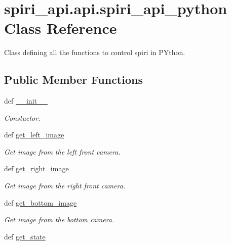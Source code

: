 \hypertarget{classspiri__api_1_1api_1_1spiri__api__python}{\section{spiri\-\_\-api.\-api.\-spiri\-\_\-api\-\_\-python \-Class \-Reference}
\label{classspiri__api_1_1api_1_1spiri__api__python}
}


\-Class defining all the functions to control spiri in \-P\-Ython.  


\subsection*{\-Public \-Member \-Functions}
\begin{DoxyCompactItemize}
\item 
\hypertarget{classspiri__api_1_1api_1_1spiri__api__python_ab9c7abbaa45f26d99e3252b381b24d3b}{def \hyperlink{classspiri__api_1_1api_1_1spiri__api__python_ab9c7abbaa45f26d99e3252b381b24d3b}{\-\_\-\-\_\-init\-\_\-\-\_\-}}\label{classspiri__api_1_1api_1_1spiri__api__python_ab9c7abbaa45f26d99e3252b381b24d3b}

\begin{DoxyCompactList}\small\item\em \-Constuctor. \end{DoxyCompactList}\item 
def \hyperlink{classspiri__api_1_1api_1_1spiri__api__python_a7eb16bb2af3be782182c6c5d29c66d5c}{get\-\_\-left\-\_\-image}
\begin{DoxyCompactList}\small\item\em \-Get image from the left front camera. \end{DoxyCompactList}\item 
def \hyperlink{classspiri__api_1_1api_1_1spiri__api__python_a6718cca393fdcf3973433a9caff9692d}{get\-\_\-right\-\_\-image}
\begin{DoxyCompactList}\small\item\em \-Get image from the right front camera. \end{DoxyCompactList}\item 
def \hyperlink{classspiri__api_1_1api_1_1spiri__api__python_ad1de6db2241aef693fe993c9c10d6600}{get\-\_\-bottom\-\_\-image}
\begin{DoxyCompactList}\small\item\em \-Get image from the bottom camera. \end{DoxyCompactList}\item 
\hypertarget{classspiri__api_1_1api_1_1spiri__api__python_abd31f9351da53d2a0dc8bb656ca8b613}{def \hyperlink{classspiri__api_1_1api_1_1spiri__api__python_abd31f9351da53d2a0dc8bb656ca8b613}{get\-\_\-state}}\label{classspiri__api_1_1api_1_1spiri__api__python_abd31f9351da53d2a0dc8bb656ca8b613}


\end{DoxyCompactItemize}
